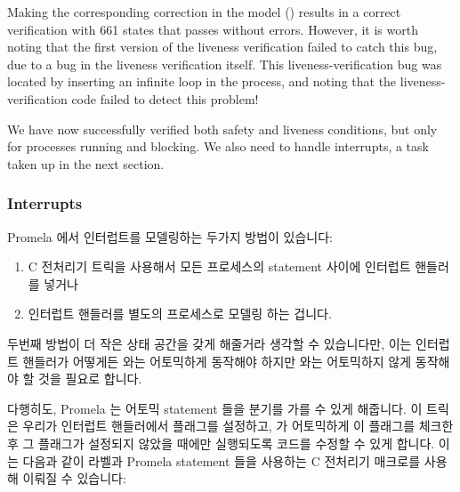 Making the corresponding correction in the
model ()
results in a correct verification with 661 states that passes without
errors.
However, it is worth noting that the first version of the liveness
verification failed to catch this bug, due to a bug in the liveness
verification itself.
This liveness-verification bug was located by inserting an infinite
loop in the  process, and noting that
the liveness-verification code failed to detect this problem!

We have now successfully verified both safety and liveness
conditions, but only for processes running and blocking.
We also need to handle interrupts, a task taken up in the next section.
\fi

\subsubsection{Interrupts}
\label{sec:formal:Interrupts}

Promela 에서 인터럽트를 모델링하는 두가지 방법이 있습니다:
\iffalse

There are a couple of ways to model interrupts in Promela:
\fi
\begin{enumerate}
\item	C 전처리기 트릭을 사용해서 모든  프로세스의
	statement 사이에 인터럽트 핸들러를 넣거나
\item	인터럽트 핸들러를 별도의 프로세스로 모델링 하는 겁니다.
\iffalse

\item	using C-preprocessor tricks to insert the interrupt handler
	between each and every statement of the \co{dynticks_nohz()}
	process, or
\item	modeling the interrupt handler with a separate process.
\fi
\end{enumerate}

두번째 방법이 더 작은 상태 공간을 갖게 해줄거라 생각할 수 있습니다만, 이는
인터럽트 핸들러가 어떻게든  와는 어토믹하게 동작해야 하지만
 와는 어토믹하지 않게 동작해야 할 것을 필요로 합니다.

다행히도, Promela 는 어토믹 statement 들을 분기를 가를 수 있게 해줍니다.
이 트릭은 우리가 인터럽트 핸들러에서 플래그를 설정하고,  가
어토믹하게 이 플래그를 체크한 후 그 플래그가 설정되지 않았을 때에만 실행되도록
코드를 수정할 수 있게 합니다.
이는 다음과 같이 라벨과 Promela statement 들을 사용하는 C 전처리기 매크로를
사용해 이뤄질 수 있습니다:
\iffalse

